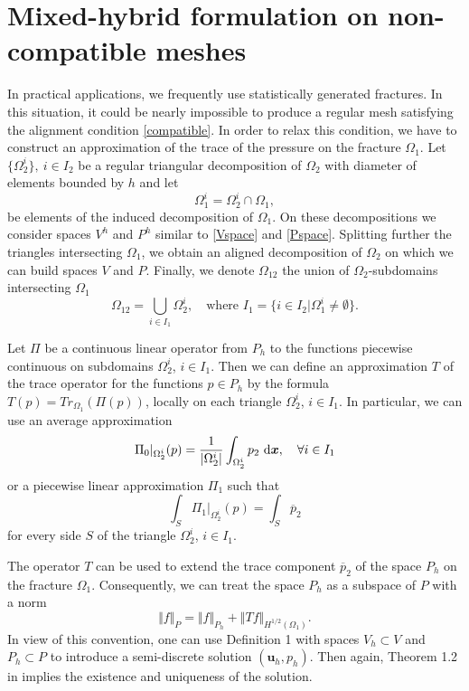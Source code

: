 \documentclass{elsart}
\def\d{\,{\rm d}}               %
\def\vc#1{\mathbf{\boldsymbol{#1}}}     %
\def\abs#1{\lvert#1\rvert}
\def\norm#1{\bigl\Vert#1\bigr\Vert} %
\def\ol#1{\overline{#1}}
\def\vl{{\vc{u}}}
\def\vx{\vc{x}}
\def\dx{\,\d\vx}
\begin{document}
\section{Mixed-hybrid formulation on non-compatible meshes}
In practical applications, we frequently use statistically generated fractures. In this situation,
it could be nearly impossible to produce a regular mesh satisfying the alignment condition
\eqref{compatible}.  In order to relax this condition, we have to construct an approximation of
the trace of the pressure on the fracture $\Omega_1$. Let $\{\Omega_2^i\},\ i\in I_2$ be a regular triangular decomposition of $\Omega_2$ with diameter of elements bounded by $h$ and let
\[
        \Omega_1^i=\Omega_2^i \cap \Omega_1,
\] be elements of the induced decomposition of $\Omega_1$.
On these decompositions we consider spaces $V^h$ and $P^h$ similar to \eqref{Vspace} and \eqref{Pspace}. Splitting further the triangles intersecting $\Omega_1$, we obtain an aligned decomposition of $\Omega_2$ on which we can build spaces $V$ and $P$.
Finally, we denote $\Omega_{12}$ the union of $\Omega_2$-subdomains intersecting $\Omega_1$
\[
  \Omega_{12}=\bigcup_{i\in I_{1}} \Omega_2^i,\quad
   \text{where }  I_{1}=\{i\in I_2| \Omega_1^i  \ne \emptyset \}.
\]

Let $\Pi$ be a continuous linear operator from $P_h$ to the functions piecewise continuous on
subdomains $\Omega_2^i$, $i\in I_1$. Then we can define an approximation $T$ of the trace operator for the functions $p\in P_h$ by the formula $T(p)=Tr_{\Omega_1}(\Pi(p))$, locally on each triangle $\Omega_2^i$, $i\in I_1$. In particular, we can use an average approximation
\[
   \Pi_0 |_{\Omega_2^i}(p) = \frac{1}{\abs{\Omega_2^i}}
   		\int_{\Omega_2^i} p_2 \dx,\quad \forall i\in I_{1}
\]
or a piecewise linear approximation $\Pi_1$ such that
\[
  \int_S \Pi_1|_{\Omega_2^i}(p) = \int_S \ol{p}_2
\]
for every side $S$ of the triangle $\Omega_2^i$, $i\in I_{1}$.

The operator $T$ can be used to extend the trace component $\ol{p}_2$ of the space $P_h$ on the fracture $\Omega_1$. Consequently, we  can treat the space $P_h$ as a subspace of $P$ with a norm
\begin{equation}\label{PspaceExtension}
 	\norm{f}_P=\norm{f}_{P_h}+\norm{T f}_{H^{1/2}(\Omega_1)}.
\end{equation}
In view of this convention, one can use Definition 1 with spaces $V_h \subset V$ and $P_h\subset P$ to introduce a semi-discrete solution $(\vl_h,p_h)$. Then again,
Theorem 1.2 in \cite{Brezzi} implies the existence and uniqueness of the solution.
\end{document}
